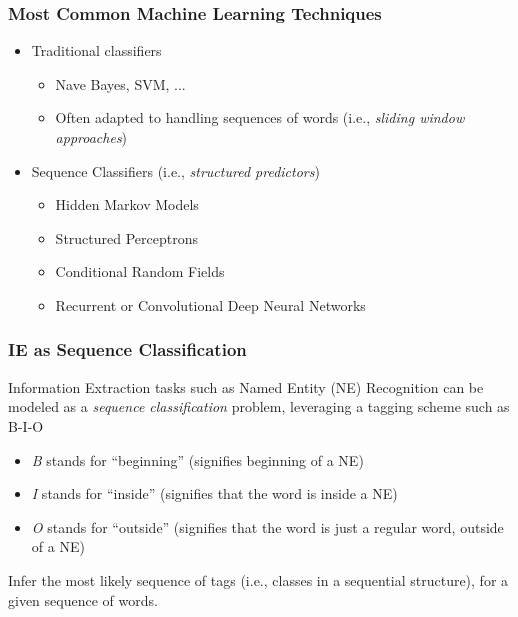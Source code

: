 \documentclass{beamer}
\begin{document}
\begin{frame}
  \frametitle{Most Common Machine Learning Techniques}
  \begin{itemize}
  \item Traditional classifiers
      \begin{itemize}
      \item Nave Bayes, SVM, ...
      \item Often adapted to handling sequences of words (i.e., {\it sliding window approaches})
      \end{itemize}
  \item Sequence Classifiers (i.e., {\it structured predictors})
      \begin{itemize}
      \item Hidden Markov Models
      \item Structured Perceptrons
      \item Conditional Random Fields
      \item Recurrent or Convolutional Deep Neural Networks
      \end{itemize}
  \end{itemize}
\end{frame}

\begin{frame}
  \frametitle{IE as Sequence Classification}
\begin{block}{}
Information Extraction tasks such as Named Entity (NE) Recognition can be modeled as a \emph{sequence classification} problem, leveraging a tagging scheme such as B-I-O
\end{block}
\begin{itemize}
\item \emph{B} stands for ``beginning'' (signifies beginning of a NE)
\item \emph{I} stands for ``inside'' (signifies that the word is inside a NE)
\item \emph{O} stands for ``outside'' (signifies that the word is just a regular word, outside of a NE)
\end{itemize}
\begin{block}{}
Infer the most likely sequence of tags (i.e., classes in a sequential structure), for a given sequence of words.
\end{block}
\end{frame}


\end{document}
